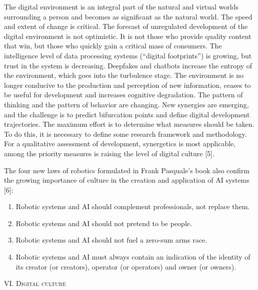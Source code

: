 \documentclass{article}
\begin{document}
\begin{multicols}{2}
The digital environment is an integral part of the
natural and virtual worlds surrounding a person and becomes as significant as the natural world. The speed and
extent of change is critical. The forecast of unregulated
development of the digital environment is not optimistic.
It is not those who provide quality content that win, but
those who quickly gain a critical mass of consumers. The
intelligence level of data processing systems (“digital
footprints”) is growing, but trust in the system is decreasing. Deepfakes and chatbots increase the entropy of the
environment, which goes into the turbulence stage. The
environment is no longer conducive to the production
and perception of new information, ceases to be useful
for development and increases cognitive degradation. The
pattern of thinking and the pattern of behavior are changing. New synergies are emerging, and the challenge is to
predict bifurcation points and define digital development
trajectories. The maximum effort is to determine what
measures should be taken. To do this, it is necessary to
define some research framework and methodology. For
a qualitative assessment of development, synergetics is
most applicable, among the priority measures is raising
the level of digital culture [5].

The four new laws of robotics formulated in Frank
Pasquale’s book also confirm the growing importance of
culture in the creation and application of AI systems [6]:
\vspace{-20pt}
\begin{enumerate}
\setlength\itemsep{-4pt}
\item[1)] Robotic systems and AI should complement professionals, not replace them.

\item[2)] Robotic systems and AI should not pretend to be
people.

\item[3)] Robotic systems and AI should not fuel a zero-sum
arms race.

\item[4)] Robotic systems and AI must always contain an
indication of the identity of its creator (or creators),
operator (or operators) and owner (or owners).
\end{enumerate}
\vspace{-8pt}
\begin{center}
\vspace{-5pt}
    \large{\textsc{VI. Digital culture}}
 \vspace{-5pt}  
\end{center}


\end{multicols}
\end{document}
